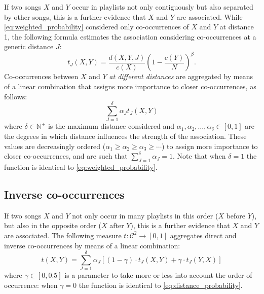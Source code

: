 If two songs $X$ and $Y$ occur in playlists not only contiguously but also separated by other songs, this is a further evidence that $X$ and $Y$ are associated.
%
While \eqref{eq:weighted_probability} considered only co-occurrences of $X$ and $Y$ at distance 1, the following formula estimates the association considering co-occurrences at a generic distance $J$:
\begin{equation}
    t_J(X,Y) = \frac{d(X,Y,J)}{c(X)}\left(1-\frac{c(Y)}{N}\right)^\beta\!\!\!\!.
\end{equation}
%
Co-occurrences between $X$ and $Y$ \emph{at different distances} are aggregated by means of a linear combination that assigns more importance to closer co-occurrences, as follows:
\begin{equation}\label{eq:distance_probability}
     \sum_{J=1}^\delta \alpha_J t_J(X,Y)   
\end{equation}
where $\delta \in \mathbb{N}^+$ is the maximum distance considered and $\alpha_1, \alpha_2, \ldots, \alpha_\delta \in [0,1]$ are the degrees in which distance influences the strength of the association. These values are decreasingly ordered  ($\alpha_1 \geqslant \alpha_2 \geqslant \alpha_3 \geqslant \cdots$) to assign more importance to closer co-occurrences, and are such that $\sum_{J=1}^\delta \alpha_J = 1$.
%
Note that when $\delta = 1$ the function is identical to \eqref{eq:weighted_probability}. 

\subsection{Inverse co-occurrences} %
\label{sub:order_of_the_occurrences}

If two songs $X$ and $Y$ not only occur in many playlists in this order ($X$ before $Y$), but also in the opposite order ($X$ after $Y$), this is a further evidence that $X$ and $Y$ are associated.
The following measure $t: \mathcal{C}^2 \to [0,1]$ aggregates direct and inverse co-occurrences by means of a linear combination:
\begin{equation}\label{eq:item_association}
 t(X,Y) = \sum_{J=1}^\delta \alpha_J \left[ (1-\gamma)\cdot t_J(X,Y) + \gamma\cdot t_J(Y,X)  \right]
\end{equation}
where $\gamma \in [0,0.5]$ is a parameter to take more or less into account the order of occurrence: when $\gamma = 0$ the function is identical to \eqref{eq:distance_probability}.

